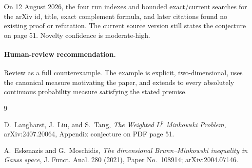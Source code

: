 \documentclass[11pt]{article}
\begin{document}
On 12 August 2026, the four run indexes and bounded exact/current searches
for the arXiv id, title, exact complement formula, and later
citations found no existing proof or refutation.  The current source version
still states the conjecture on page 51.  Novelty confidence is moderate-high.

\paragraph{Human-review recommendation.}
Review as a full counterexample.  The example is explicit, two-dimensional,
uses the canonical measure motivating the paper, and extends to every
absolutely continuous probability measure satisfying the stated premise.

\begin{thebibliography}{9}

D.~Langharst, J.~Liu, and S.~Tang,
\emph{The Weighted \(L^p\) Minkowski Problem},
arXiv:2407.20064, Appendix conjecture on PDF page 51.

A.~Eskenazis and G.~Moschidis,
\emph{The dimensional Brunn--Minkowski inequality in Gauss space},
J. Funct. Anal. 280 (2021), Paper No.~108914; arXiv:2004.07146.

\end{thebibliography}
\end{document}
